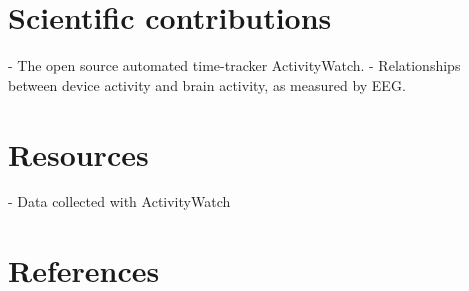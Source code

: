 \documentclass[a4paper]{article}   %
\begin{document}
\section{Scientific contributions}
\begin{markdown}

 - The open source automated time-tracker ActivityWatch.
 - Relationships between device activity and brain activity, as measured by EEG.

\end{markdown}

\section{Resources}
\begin{markdown}

 - Data collected with ActivityWatch

\end{markdown}


\section{References}

\printbibliography{}
\end{document}
